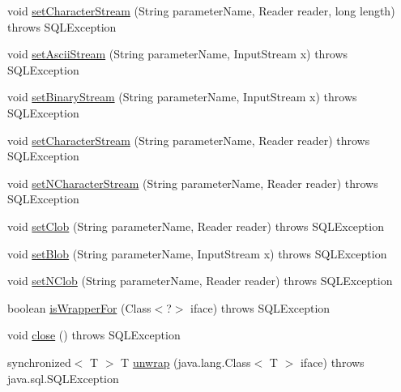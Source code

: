 \begin{DoxyCompactItemize}
\item 
void \mbox{\hyperlink{classcom_1_1mysql_1_1cj_1_1jdbc_1_1_callable_statement_wrapper_af9333c7ad778e02028067ccd121fdd66}{set\+Character\+Stream}} (String parameter\+Name, Reader reader, long length)  throws S\+Q\+L\+Exception 
\item 
void \mbox{\hyperlink{classcom_1_1mysql_1_1cj_1_1jdbc_1_1_callable_statement_wrapper_a5889ef071cb5ed26ee3136e5b18a4fe7}{set\+Ascii\+Stream}} (String parameter\+Name, Input\+Stream x)  throws S\+Q\+L\+Exception 
\item 
void \mbox{\hyperlink{classcom_1_1mysql_1_1cj_1_1jdbc_1_1_callable_statement_wrapper_a706189ca9c4467d5b91906a376fe3774}{set\+Binary\+Stream}} (String parameter\+Name, Input\+Stream x)  throws S\+Q\+L\+Exception 
\item 
void \mbox{\hyperlink{classcom_1_1mysql_1_1cj_1_1jdbc_1_1_callable_statement_wrapper_a893fb5d17115cba6a90a16b9191a72e7}{set\+Character\+Stream}} (String parameter\+Name, Reader reader)  throws S\+Q\+L\+Exception 
\item 
void \mbox{\hyperlink{classcom_1_1mysql_1_1cj_1_1jdbc_1_1_callable_statement_wrapper_a6c84ab6864480e3be64630516cf06d37}{set\+N\+Character\+Stream}} (String parameter\+Name, Reader reader)  throws S\+Q\+L\+Exception 
\item 
void \mbox{\hyperlink{classcom_1_1mysql_1_1cj_1_1jdbc_1_1_callable_statement_wrapper_a1538788a23a7c20ad0e677ff9aefd6fa}{set\+Clob}} (String parameter\+Name, Reader reader)  throws S\+Q\+L\+Exception 
\item 
void \mbox{\hyperlink{classcom_1_1mysql_1_1cj_1_1jdbc_1_1_callable_statement_wrapper_af2ea894427fc22d18316aa88356946cc}{set\+Blob}} (String parameter\+Name, Input\+Stream x)  throws S\+Q\+L\+Exception 
\item 
void \mbox{\hyperlink{classcom_1_1mysql_1_1cj_1_1jdbc_1_1_callable_statement_wrapper_aab6be9977f1f392d2773a3b36bccccbe}{set\+N\+Clob}} (String parameter\+Name, Reader reader)  throws S\+Q\+L\+Exception 
\item 
boolean \mbox{\hyperlink{classcom_1_1mysql_1_1cj_1_1jdbc_1_1_callable_statement_wrapper_ad588d39d1deeda920f425e77bc3d167a}{is\+Wrapper\+For}} (Class$<$?$>$ iface)  throws S\+Q\+L\+Exception 
\item 
void \mbox{\hyperlink{classcom_1_1mysql_1_1cj_1_1jdbc_1_1_callable_statement_wrapper_a2afbb0b1bef5811e72e7b4f2bb4b3263}{close}} ()  throws S\+Q\+L\+Exception 
\item 
synchronized$<$ T $>$ T \mbox{\hyperlink{classcom_1_1mysql_1_1cj_1_1jdbc_1_1_callable_statement_wrapper_aa7ce77aa93341891ae30260b6f45f44c}{unwrap}} (java.\+lang.\+Class$<$ T $>$ iface)  throws java.\+sql.\+S\+Q\+L\+Exception 

\end{DoxyCompactItemize}

